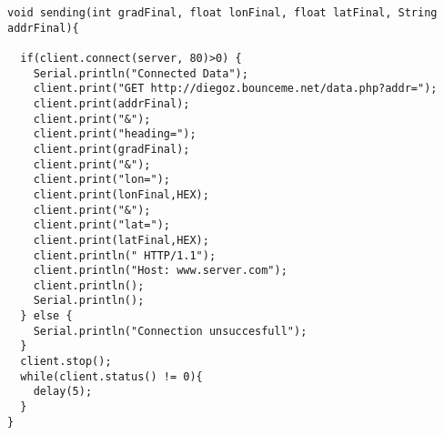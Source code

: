 \begin{verbatim}
void sending(int gradFinal, float lonFinal, float latFinal, String addrFinal){

  if(client.connect(server, 80)>0) {
    Serial.println("Connected Data");
    client.print("GET http://diegoz.bounceme.net/data.php?addr=");
    client.print(addrFinal);
    client.print("&");
    client.print("heading=");
    client.print(gradFinal);
    client.print("&");
    client.print("lon=");
    client.print(lonFinal,HEX);
    client.print("&");
    client.print("lat=");
    client.print(latFinal,HEX);
    client.println(" HTTP/1.1");
    client.println("Host: www.server.com");
    client.println();
    Serial.println();
  } else {
    Serial.println("Connection unsuccesfull");
  }
  client.stop();
  while(client.status() != 0){
    delay(5);
  }
}

\end{verbatim}